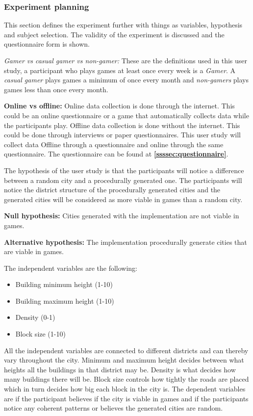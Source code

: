 		\subsubsection{Experiment planning}
		This section defines the experiment further with things as variables, hypothesis and subject selection. The validity of the experiment is discussed and the questionnaire form is shown.
		
			\textit{Gamer vs casual gamer vs non-gamer:} These are the definitions used in this user study, a participant who plays games at least once every week is a \textit{Gamer}. A \textit{casual gamer} plays games a minimum of once every month and \textit{non-gamers} plays games less than once every month. 
			
			\textbf{Online vs offline: }
			Online data collection is done through the internet. This could be an online questionnaire or a game that automatically collects data while the participants play. Offline data collection is done without the internet. This could be done through interviews or paper questionnaires. This user study will collect data Offline through a questionnaire and online through the same questionnaire. The questionnaire can be found at \textbf{\ref{ssssec:questionnaire}}.
			
			The hypothesis of the user study is that the participants will notice a difference between a random city and a procedurally generated one. The participants will notice the district structure of the procedurally generated cities and the generated cities will be considered as more viable in games than a random city.
			
			\textbf{Null hypothesis:} Cities generated with the implementation are not viable in games.
			
			\textbf{Alternative hypothesis:} The implementation procedurally generate cities that are viable in games.
			
			The independent variables are the following:
			\begin{itemize}
				\item Building minimum height (1-10)
				\item Building maximum height (1-10)
				\item Density (0-1)
				\item Block size (1-10)
			\end{itemize}
			All the independent variables are connected to different districts and can thereby vary throughout the city. Minimum and maximum height decides between what heights all the buildings in that district may be. Density is what decides how many buildings there will be. Block size controls how tightly the roads are placed which in turn decides how big each block in the city is.
			The dependent variables are if the participant believes if the city is viable in games and if the participants notice any coherent patterns or believes the generated cities are random.
			
